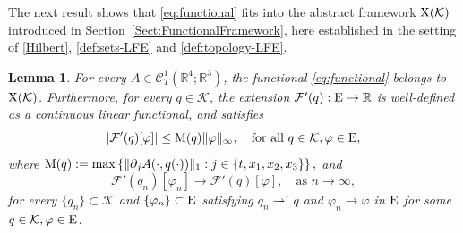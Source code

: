 \documentclass{article}
\newcommand{\boK}{\mathcal{K}}
\newcommand{\R}{\mathbb{R}}
\newcommand{\boF}{\mathcal{F}}
\newcommand{\Ebanach}{{\textnormal E}}
\newcommand{\X}{{\textnormal X}}
\newtheorem{lemma}{Lemma}[section]
\theoremstyle{definition}
\begin{document}
	The next result shows that \eqref{eq:functional} fits into the abstract framework $\X(\boK)$ introduced in Section~\ref{Sect:FunctionalFramework}, here established in the setting of \eqref{Hilbert}, \eqref{def:sets-LFE} and \eqref{def:topology-LFE}. 
	\begin{lemma}\label{Lemma:Set-X-LFE}
		For every $A\in\mathcal{C}_T^1(\R^4;\R^3)$, the functional \eqref{eq:functional} belongs to $\X(\boK)$. Furthermore, for every $q\in\boK$, the extension  $\boF'(q): \Ebanach\to \R$ is well-defined as a continuous linear functional, and satisfies
		\begin{equation}\label{eq:F'estimate-LFE}
			\left|\boF'(q)[\varphi]\right|\leq {\hbox{M}}(q)\|\varphi\|_\infty ,\quad\hbox{for all }q\in\boK, \varphi\in \Ebanach,
		\end{equation}
		where $\hbox{M}(q):=\max\left\{\|\partial_jA(\cdot,q(\cdot))\|_{1}:j\in\{t,x_1,x_2,x_3\}\right\},$  and 
		\begin{equation}\label{eq:conv-F'-LFE}
			\boF'(q_n)[\varphi_n]\to\boF'(q)[\varphi],\quad\text{as }n\to\infty,
		\end{equation}
		for every $\{q_n\}\subset\boK$ and $\{\varphi_n\}\subset \Ebanach$ satisfying $q_n\rightharpoonup^\tau q$ and $\varphi_n\to\varphi$ in $\Ebanach$ for some $q\in\boK,\varphi\in \Ebanach$.
	\end{lemma}
\end{document}
